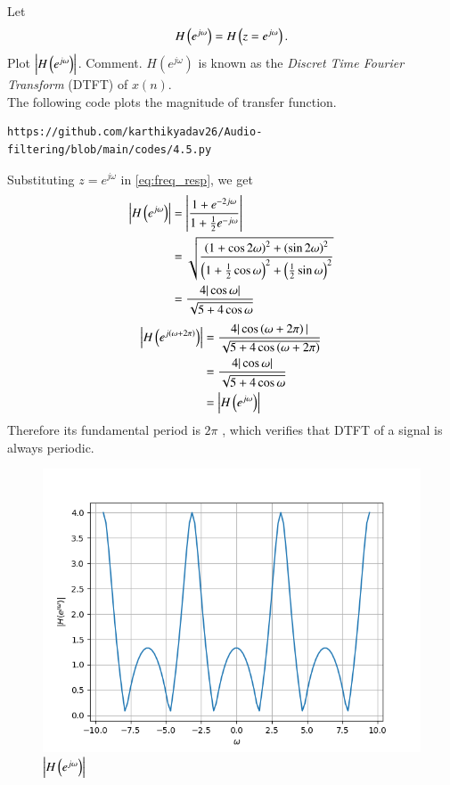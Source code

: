 \documentclass[journal,12pt,twocolumn]{IEEEtran}
\theoremstyle{remark}
\renewcommand\thesection{\arabic{section}}
\begin{document}
\begin{enumerate}[label=\thesection.\arabic*]
Let
\begin{equation}
	H\left(e^{j \omega}\right) = H\left(z = e^{j \omega}\right).
\end{equation}
Plot $\left\vert H\left(e^{j \omega}\right)\right\vert$.  Comment.  $H(e^{j \omega})$ is
known as the {\em Discret Time Fourier Transform} (DTFT) of $x(n)$.
\\
\solution The following code plots the magnitude of transfer function.
\begin{lstlisting}
https://github.com/karthikyadav26/Audio-filtering/blob/main/codes/4.5.py
\end{lstlisting}
Substituting $z = e^{j \omega}$ in \eqref{eq:freq_resp}, we get
\begin{align}
	\left|H\left(e^{j\omega}\right)\right| &= \left|\frac{1 + e^{-2j\omega}}{1 + \frac{1}{2}e^{-j\omega}}\right| \\
									  &= \sqrt{\frac{\left(1 + \cos{2\omega}\right)^2 + \left(\sin{2\omega}\right)^2}{\left(1 + \frac{1}{2}\cos{\omega}\right)^2 + \left(\frac{1}{2}\sin{\omega}\right)^2}}\\
									  &= \frac{4|\cos{\omega}|}{\sqrt{5 + 4\cos{\omega}}}
\end{align}
\begin{align}
	\left|H\left(e^{j\left(\omega + 2\pi\right)}\right)\right| &= \frac{4|\cos\left(\omega + 2\pi\right)|}{\sqrt{5 + 4\cos\left(\omega + 2\pi\right)}} \\
											   &= \frac{4|\cos{\omega}|}{\sqrt{5 + 4\cos{\omega}}} \\
											   &= \left|H\left(e^{j\omega}\right)\right|	
\end{align}
Therefore its fundamental period is $2\pi$ , which verifies that DTFT of a signal is always periodic.

\begin{figure}[htbp]
\centering
\includegraphics[width=\columnwidth]{figs/H(z)_3.5.png}
\caption{$\left\vert H\left(e^{j\omega}\right)\right\vert$}
\label{fig:H(z)_3.5}
\end{figure}
\end{enumerate}
\end{document}
